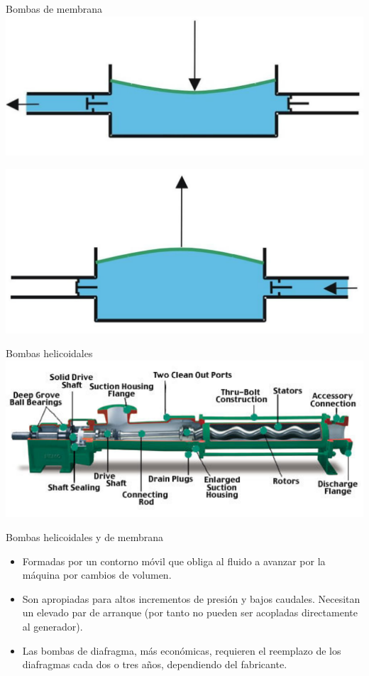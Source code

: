 \documentclass[xcolor={usenames,svgnames,dvipsnames}]{beamer}
\begin{document}
\begin{frame}[label=sec-2-2-3]{Bombas de membrana}
\includegraphics[width=.9\linewidth]{../figs/800px-Bomba_diafragma_impulsando.pdf}

\includegraphics[width=.9\linewidth]{../figs/Bomba_diafragma_aspirando.pdf}
\end{frame}

\begin{frame}[label=sec-2-2-4]{Bombas helicoidales}
\includegraphics[width=.9\linewidth]{../figs/bombatornillo.pdf}
\end{frame}

\begin{frame}[label=sec-2-2-5]{Bombas helicoidales y de membrana}
\begin{itemize}
\item Formadas por un \alert{contorno móvil} que obliga al fluido a avanzar por la máquina por \alert{cambios de volumen}.

\item Son apropiadas para \alert{altos incrementos de presión y bajos caudales}.  Necesitan un \alert{elevado par de arranque} (por tanto no pueden ser acopladas directamente al generador).

\item Las bombas de diafragma, más económicas, requieren el \alert{reemplazo de los diafragmas} cada dos o tres años, dependiendo del fabricante.
\end{itemize}
\end{frame}
\end{document}

